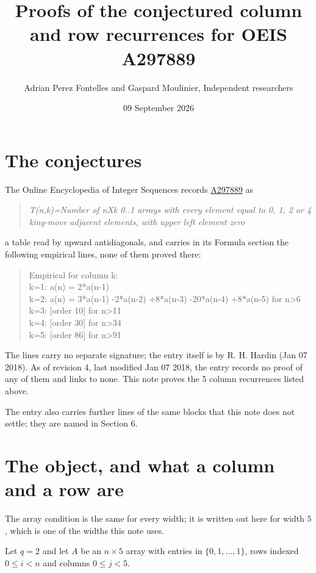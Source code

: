 \documentclass[11pt]{article}
\title{Proofs of the conjectured column and row recurrences for OEIS A297889}
\author{Adrian Perez Fontelles and Gaspard Moulinier, Independent researchers}
\date{09 September 2026}
\theoremstyle{definition}
\begin{document}
\maketitle
\section{The conjectures}

The Online Encyclopedia of Integer Sequences records \href{https://oeis.org/A297889}{A297889} as

\begin{quote}\itshape T(n,k)=Number of nXk 0..1 arrays with every element equal to 0, 1, 2 or 4 king-move adjacent elements, with upper left element zero\end{quote}

a table read by upward antidiagonals, and carries in its Formula section the following empirical lines, none of them proved there:

\begin{quote}\ttfamily Empirical for column k:\\
k=1: a(n) = 2*a(n-1)\\k=2: a(n) = 3*a(n-1) -2*a(n-2) +8*a(n-3) -20*a(n-4) +8*a(n-5) for n>6\\k=3: [order 10] for n>11\\k=4: [order 30] for n>34\\k=5: [order 86] for n>91\end{quote}

The lines carry no separate signature; the entry itself is by R. H. Hardin (Jan 07 2018). As of revision 4, last modified Jan 07 2018, the entry records no proof of any of them and links to none. This note proves the 5 column recurrences listed above.

The entry also carries further lines of the same blocks that this note does not settle; they are named in Section 6.

\section{The object, and what a column and a row are}

The array condition is the same for every width; it is written out here for width $5$, which is one of the widths this note uses.

Let $q = 2$ and let $A$ be an $n \times 5$ array with entries in $\{0,1,\dots,1\}$, rows indexed $0 \le i < n$ and columns $0 \le j < 5$.
\end{document}
